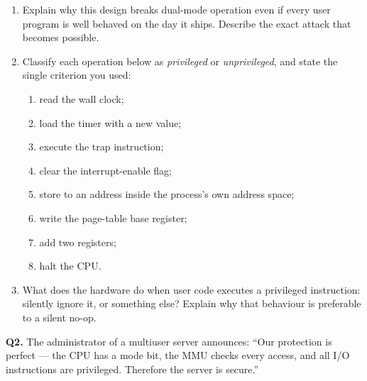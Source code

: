 \documentclass[11pt]{article}
\begin{document}
\begin{enumerate}
  \item[(a)] Explain why this design breaks dual-mode operation even if every user program is well behaved on the day it ships. Describe the exact attack that becomes possible.
  \item[(b)] Classify each operation below as \emph{privileged} or \emph{unprivileged}, and state the single criterion you used:
    \begin{enumerate}
      \item[(i)] read the wall clock;
      \item[(ii)] load the timer with a new value;
      \item[(iii)] execute the trap instruction;
      \item[(iv)] clear the interrupt-enable flag;
      \item[(v)] store to an address inside the process's own address space;
      \item[(vi)] write the page-table base register;
      \item[(vii)] add two registers;
      \item[(viii)] halt the CPU.
    \end{enumerate}
  \item[(c)] What does the hardware do when user code executes a privileged instruction: silently ignore it, or something else? Explain why that behaviour is preferable to a silent no-op.
\end{enumerate}

\textbf{Q2.} The administrator of a multiuser server announces: ``Our protection is perfect --- the CPU has a mode bit, the MMU checks every access, and all I/O instructions are privileged. Therefore the server is secure.''
\end{document}
